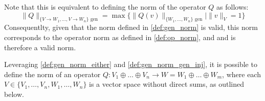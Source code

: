 Note that this is equivalent to defining the norm of the operator $Q$ as follows:
\begin{equation}
  \|Q\|_{\{ V \rightarrow W_1,\ldots ,V \rightarrow W_n\} \text{ gen}} = \max \{ \|Q (v)\|_{\{ W_1,\ldots , W_n\} \text{ gen}}  \mid  \|v\|_{V} = 1 \}
\end{equation}
Consequentlty, given that the norm defined in \autoref{def:gen_norm} is valid, this norm corresponds to the operator norm as defined in \autoref{def:op_norm}, and and is therefore a valid norm.



Leveraging \autoref{def:gen_norm_either} and \autoref{def:gen_norm_gen_inj}, it is possible to define the norm of an operator $Q: V_1 \oplus \ldots \oplus V_n  \rightarrow W = W_1 \oplus \ldots \oplus W_m$, where each $V \in \{V_1, \ldots, V_n, W_1, \ldots, W_n\}$ is a vector space without direct sums, as outlined below.

